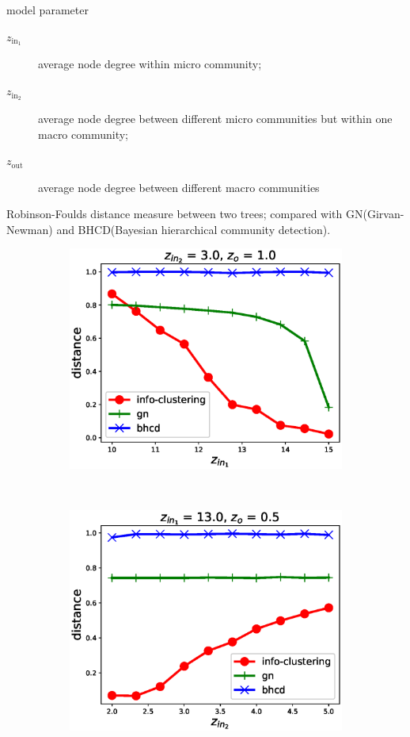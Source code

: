 \documentclass[notheorems]{beamer}
\begin{document}
\begin{frame}
	\begin{block}{model parameter}
	\begin{description}
	  \item[$z_{\mathrm{in}_1}$] average node degree within micro community;
	  \item[$z_{\mathrm{in}_2}$] average node degree between different micro communities but within one macro community;  
	  \item[$z_{\mathrm{out}}$] average node degree between different macro communities
    \end{description}
    Robinson-Foulds distance measure between two trees;    
    {\footnotesize compared with GN(Girvan-Newman) and BHCD(Bayesian hierarchical community detection).
	}
    \end{block}
\begin{figure}
	\centering
	\begin{subfigure}{0.33\textwidth}
		\includegraphics[width=\textwidth]{paper/pic/z_in_1.eps}
		\caption{}
	\end{subfigure}~
	\begin{subfigure}{0.33\textwidth}
		\includegraphics[width=\textwidth]{paper/pic/z_in_2.eps}

\end{subfigure}
\end{figure}
\end{frame}
\end{document}
